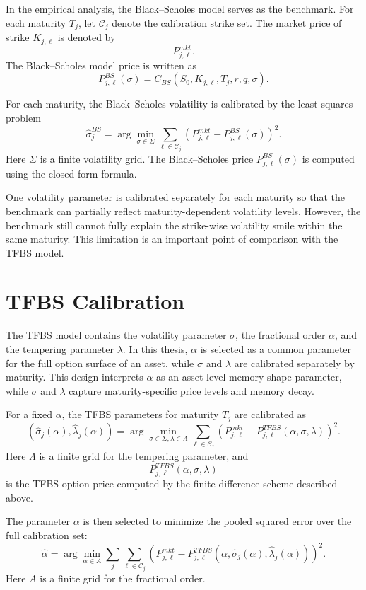 \documentclass[11pt,a4paper]{report}
\begin{document}
In the empirical analysis, the Black--Scholes model serves as the benchmark. For each maturity $T_j$, let $\mathcal{C}_j$ denote the calibration strike set. The market price of strike $K_{j,\ell}$ is denoted by
\[
P_{j,\ell}^{mkt}.
\]
The Black--Scholes model price is written as
\[
P_{j,\ell}^{BS}(\sigma)
=
C_{BS}(S_0,K_{j,\ell},T_j,r,q,\sigma).
\]

For each maturity, the Black--Scholes volatility is calibrated by the least-squares problem
\[
\widehat{\sigma}_j^{BS}
=
\arg\min_{\sigma\in\Sigma}
\sum_{\ell\in\mathcal{C}_j}
\left(
P_{j,\ell}^{mkt}
-
P_{j,\ell}^{BS}(\sigma)
\right)^2.
\]
Here $\Sigma$ is a finite volatility grid. The Black--Scholes price $P_{j,\ell}^{BS}(\sigma)$ is computed using the closed-form formula.

One volatility parameter is calibrated separately for each maturity so that the benchmark can partially reflect maturity-dependent volatility levels. However, the benchmark still cannot fully explain the strike-wise volatility smile within the same maturity. This limitation is an important point of comparison with the TFBS model.

\section{TFBS Calibration}

The TFBS model contains the volatility parameter $\sigma$, the fractional order $\alpha$, and the tempering parameter $\lambda$. In this thesis, $\alpha$ is selected as a common parameter for the full option surface of an asset, while $\sigma$ and $\lambda$ are calibrated separately by maturity. This design interprets $\alpha$ as an asset-level memory-shape parameter, while $\sigma$ and $\lambda$ capture maturity-specific price levels and memory decay.

For a fixed $\alpha$, the TFBS parameters for maturity $T_j$ are calibrated as
\[
(\widehat{\sigma}_j(\alpha),\widehat{\lambda}_j(\alpha))
=
\arg\min_{\sigma\in\Sigma,\lambda\in\Lambda}
\sum_{\ell\in\mathcal{C}_j}
\left(
P_{j,\ell}^{mkt}
-
P_{j,\ell}^{TFBS}(\alpha,\sigma,\lambda)
\right)^2.
\]
Here $\Lambda$ is a finite grid for the tempering parameter, and
\[
P_{j,\ell}^{TFBS}(\alpha,\sigma,\lambda)
\]
is the TFBS option price computed by the finite difference scheme described above.

The parameter $\alpha$ is then selected to minimize the pooled squared error over the full calibration set:
\[
\widehat{\alpha}
=
\arg\min_{\alpha\in A}
\sum_j
\sum_{\ell\in\mathcal{C}_j}
\left(
P_{j,\ell}^{mkt}
-
P_{j,\ell}^{TFBS}
(\alpha,\widehat{\sigma}_j(\alpha),\widehat{\lambda}_j(\alpha))
\right)^2.
\]
Here $A$ is a finite grid for the fractional order.
\end{document}
